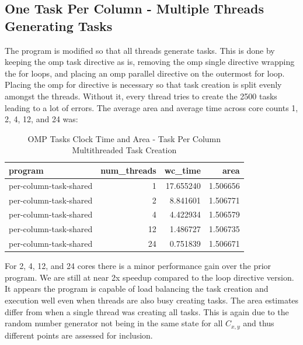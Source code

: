 \documentclass{article}
\begin{document}
\subsection{One Task Per Column - Multiple Threads Generating Tasks}
The program is modified so that all threads generate tasks. This is done by 
keeping the omp task directive as is, removing the omp single directive wrapping the for loops, 
and placing an omp parallel directive on the outermost for loop. Placing the omp for directive is necessary 
so that task creation is split evenly amongst the threads. Without it, every thread tries to create the 2500 tasks 
leading to a lot of errors. The average area and average time across core counts 1, 2, 4, 12, and 24 was:
\begin{table}[H]
    \centering
    \caption{OMP Tasks Clock Time and Area - Task Per Column Multithreaded Task Creation}
    \fontsize{12}{14}\selectfont
    \begin{tabular}[t]{l|r|r|r}
    \hline
    program & num\_threads & wc\_time & area\\
    \hline
    per-column-task-shared & 1 & 17.655240 & 1.506656\\
    \hline
    per-column-task-shared & 2 & 8.841601 & 1.506771\\
    \hline
    per-column-task-shared & 4 & 4.422934 & 1.506579\\
    \hline
    per-column-task-shared & 12 & 1.486727 & 1.506735\\
    \hline
    per-column-task-shared & 24 & 0.751839 & 1.506671\\
    \hline
    \end{tabular}
\end{table}
\noindent For 2, 4, 12, and 24 cores there is a minor performance gain over the prior program. 
We are still at near 2x speedup compared to the loop directive version. It appears the program is 
capable of load balancing the task creation and execution well even when threads are also busy creating tasks. The area 
estimates differ from when a single thread was creating all tasks. This is again due to the random number generator 
not being in the same state for all $C_{x,y}$ and thus different points are assessed for 
inclusion.
\end{document}
